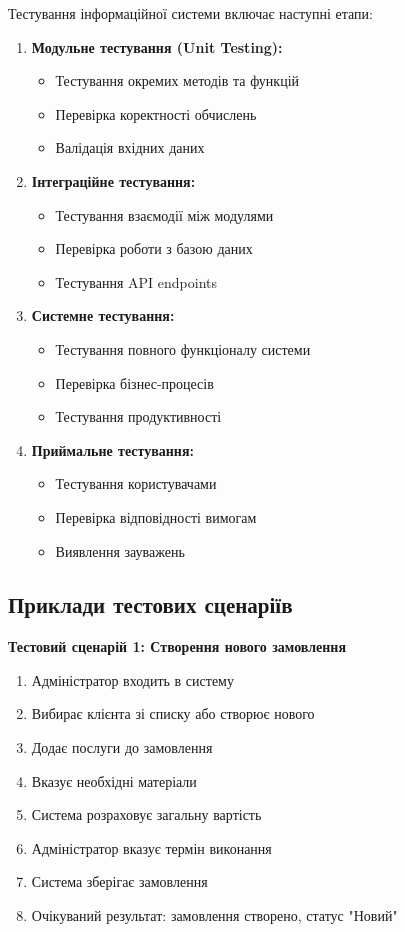 \documentclass[14pt,a4paper]{extarticle}
\begin{document}
Тестування інформаційної системи включає наступні етапи:

\begin{enumerate}
    \item \textbf{Модульне тестування (Unit Testing):}
    \begin{itemize}
        \item Тестування окремих методів та функцій
        \item Перевірка коректності обчислень
        \item Валідація вхідних даних
    \end{itemize}
    
    \item \textbf{Інтеграційне тестування:}
    \begin{itemize}
        \item Тестування взаємодії між модулями
        \item Перевірка роботи з базою даних
        \item Тестування API endpoints
    \end{itemize}
    
    \item \textbf{Системне тестування:}
    \begin{itemize}
        \item Тестування повного функціоналу системи
        \item Перевірка бізнес-процесів
        \item Тестування продуктивності
    \end{itemize}
    
    \item \textbf{Приймальне тестування:}
    \begin{itemize}
        \item Тестування користувачами
        \item Перевірка відповідності вимогам
        \item Виявлення зауважень
    \end{itemize}
\end{enumerate}

\subsection{Приклади тестових сценаріїв}

\textbf{Тестовий сценарій 1: Створення нового замовлення}

\begin{enumerate}
    \item Адміністратор входить в систему
    \item Вибирає клієнта зі списку або створює нового
    \item Додає послуги до замовлення
    \item Вказує необхідні матеріали
    \item Система розраховує загальну вартість
    \item Адміністратор вказує термін виконання
    \item Система зберігає замовлення
    \item Очікуваний результат: замовлення створено, статус "Новий"
\end{enumerate}
\end{document}
